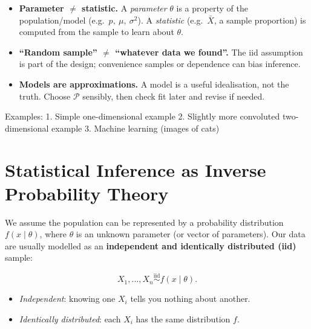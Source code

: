\documentclass[
  letterpaper,
  DIV=11,
  numbers=noendperiod]{scrreprt}
\providecommand{\tightlist}{%
  \setlength{\itemsep}{0pt}\setlength{\parskip}{0pt}}
\theoremstyle{definition}
\theoremstyle{plain}
\theoremstyle{definition}
\theoremstyle{remark}
\begin{document}
\begin{tcolorbox}[enhanced jigsaw, left=2mm, toprule=.15mm, breakable, opacityback=0, titlerule=0mm, toptitle=1mm, colbacktitle=quarto-callout-tip-color!10!white, colframe=quarto-callout-tip-color-frame, coltitle=black, rightrule=.15mm, leftrule=.75mm, bottomrule=.15mm, arc=.35mm, bottomtitle=1mm, title=\textcolor{quarto-callout-tip-color}{\faLightbulb}\hspace{0.5em}{Common misconceptions and how to avoid them}, colback=white, opacitybacktitle=0.6]

\begin{itemize}
\tightlist
\item
  \textbf{Parameter \(\neq\) statistic.} A \emph{parameter} \(\theta\)
  is a property of the population/model (e.g.~\(p,\ \mu,\ \sigma^2\)). A
  \emph{statistic} (e.g.~\(\bar{X}\), a sample proportion) is computed
  from the sample to learn about \(\theta\).
\item
  \textbf{``Random sample'' \(\neq\) ``whatever data we found''.} The
  iid assumption is part of the design; convenience samples or
  dependence can bias inference.
\item
  \textbf{Models are approximations.} A model is a useful idealisation,
  not the truth. Choose \(\mathcal{P}\) sensibly, then check fit later
  and revise if needed.
\end{itemize}

\end{tcolorbox}

Examples: 1. Simple one-dimensional example 2. Slightly more convoluted
two-dimensional example 3. Machine learning (images of cats)

\section{Statistical Inference as Inverse Probability
Theory}\label{statistical-inference-as-inverse-probability-theory}

We assume the population can be represented by a probability
distribution \(f(x\mid \theta)\), where \(\theta\) is an unknown
parameter (or vector of parameters). Our data are usually modelled as an
\textbf{independent and identically distributed (iid)} sample:

\[
X_1,\ldots,X_n \stackrel{\text{iid}}{\sim} f(x\mid \theta).
\]

\begin{itemize}
\tightlist
\item
  \emph{Independent}: knowing one \(X_i\) tells you nothing about
  another.
\item
  \emph{Identically distributed}: each \(X_i\) has the same distribution
  \(f\).
\end{itemize}
\end{document}
